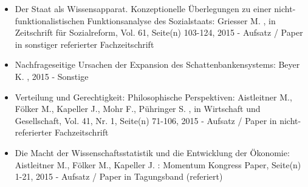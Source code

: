 \begin{itemize}
	 \item Der Staat als Wissensapparat. Konzeptionelle Überlegungen zu einer nicht-funktionalistischen Funktionsanalyse des Sozialstaats: Griesser M. , in Zeitschrift für Sozialreform, Vol. 61, Seite(n) 103-124, 2015 - Aufsatz / Paper in sonstiger referierter Fachzeitschrift
	 \item Nachfrageseitige Ursachen der Expansion des Schattenbankensystems: Beyer K. , 2015 - Sonstige
	 \item Verteilung und Gerechtigkeit: Philosophische  Perspektiven: Aistleitner M., Fölker M., Kapeller J., Mohr F., Pühringer S. , in Wirtschaft und Gesellschaft, Vol. 41, Nr. 1, Seite(n) 71-106, 2015 - Aufsatz / Paper in nicht-referierter Fachzeitschrift
	 \item Die Macht der Wissenschaftsstatistik und die Entwicklung der Ökonomie: Aistleitner M., Fölker M., Kapeller J. : Momentum Kongress Paper, Seite(n) 1-21, 2015 - Aufsatz / Paper in Tagungsband (referiert)
\end{itemize} 
